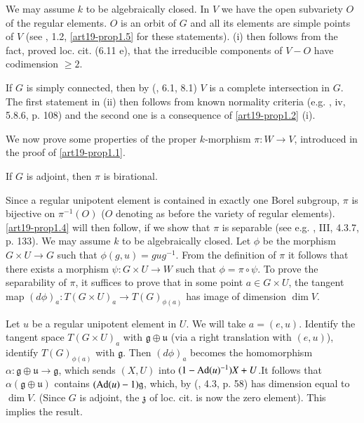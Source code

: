 We may assume $k$ to be algebraically closed. In $V$ we have the open subvariety $O$ of the regular elements. $O$ is an orbit of $G$ and all its elements are simple points of $V$ (see \cite{art19-key15}, 1.2, \ref{art19-prop1.5} for these statements). (i) then follows from the fact, proved loc. cit. (6.11 e), that the irreducible components of $V-O$ have codimension $\geq 2$.

If $G$ is simply connected, then by (\cite{art19-key15}, 6.1, 8.1) $V$ is a complete intersection in $G$. The first statement in (ii) then follows from known normality criteria (e.g. \cite{art19-key7}, iv, 5.8.6, p. 108) and the second one is a consequence of \ref{art19-prop1.2} (i).

We now prove some properties of the proper $k$-morphism $\pi:W\to V$, introduced in the proof of \ref{art19-prop1.1}.

\begin{proposition}\label{art19-prop1.4}
If $G$ is adjoint, then $\pi$ is birational.
\end{proposition}

Since a regular unipotent element is contained in exactly one Borel subgroup, $\pi$ is bijective on $\pi^{-1}(O)$ ($O$ denoting as before the variety of regular elements). \ref{art19-prop1.4} will then follow, if we show that $\pi$ is separable (see e.g. \cite{art19-key17}, III, 4.3.7, p. 133). We may assume $k$ to be algebraically closed. Let $\phi$ be the morphism $G\times U\to G$ such that $\phi(g,u)=gug^{-1}$. From the definition of $\pi$ it follows that there exists a morphism $\psi : G\times U\to W$ such that $\phi=\pi\circ\psi$. To prove the separability of $\pi$, it suffices to prove that in some point $a\in G\times U$, the tangent map $(d\phi)_{a}:T(G\times U)_{a}\to T(G)_{\phi(a)}$ has image of dimension $\dim V$.

Let $u$ be a regular unipotent element in $U$. We will take $a=(e,u)$. Identify the tangent space $T(G\times U)_{a}$ with $\mathfrak{g}\oplus \mathfrak{u}$ (via a right translation with $(e,u)$), identify $T(G)_{\phi(a)}$ with $\mathfrak{g}$. Then $(d\phi)_{a}$ becomes the homomorphism $\alpha :\mathfrak{g}\oplus \mathfrak{u}\to \mathfrak{g}$, which sends $(X,U)$ into $(1-\operatorname{\mathrm{Ad}}(u)^{-1})X+U$.\pageoriginale It follows that $\alpha(\mathfrak{g}\oplus \mathfrak{u})$ contains $(\operatorname{\mathrm{Ad}} (u)-1)\mathfrak{g}$, which, by (\cite{art19-key15}, 4.3, p. 58) has dimension equal to $\dim V$. (Since $G$ is adjoint, the $\mathfrak{z}$ of loc. cit. is now the zero element). This implies the result.

